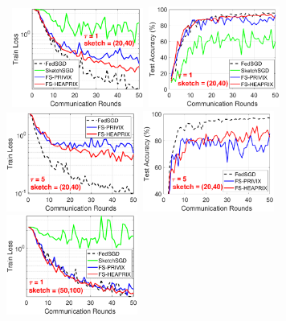 \documentclass[twoside]{article}
\begin{document}
\begin{figure}[t]
	\begin{center}
		\mbox{			   
		\includegraphics[width=1.7in]{MNIST_figures/local1_sketch20_iid0_train_loss.eps} \hspace{-0.2in}
		\includegraphics[width=1.7in]{MNIST_figures/local1_sketch20_iid0_test_acc.eps} \hspace{-0.2in}
		}
		\mbox{
		\includegraphics[width=1.7in]{MNIST_figures/local5_sketch20_iid0_train_loss.eps} \hspace{-0.2in}
		\includegraphics[width=1.7in]{MNIST_figures/local5_sketch20_iid0_test_acc.eps}\hspace{-0.2in}
		}
		\mbox{
		 \includegraphics[width=1.7in]{MNIST_figures/local1_sketch50_iid0_train_loss.eps} \hspace{-0.2in}
}
\end{center}
\end{figure}
\end{document}
